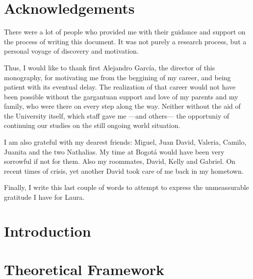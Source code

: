 \documentclass[12pt,letterpaper,oneside]{book}
\begin{document}
\vspace{2mm}

\chapter*{Acknowledgements}

There were a lot of people who provided me with their guidance and support on the process of writing this document. 
It was not purely a research process, but a personal voyage of discovery and motivation. 

Thus, I would like to thank first Alejandro García, the director of this monography, 
for motivating me from the beggining of my career, and being patient with its eventual delay. 
The realization of that career would not have been possible without the gargantuan support and love of my parents and my family, 
who were there on every step along the way.
Neither without the aid of the University itself, which staff gave me ---and others--- 
the opportuniy of continuing our studies on the still ongoing world situation.

I am also grateful with my dearest friends: Miguel, Juan David, Valeria, Camilo, Juanita and the two Nathalias. 
My time at Bogotá would have been very sorrowful if not for them. 
Also my roommates, David, Kelly and Gabriel. 
On recent times of crisis, yet another David took care of me back in my hometown.

Finally, I write this last couple of words to attempt to express the unmeassurable gratitude I have for Laura.

\mainmatter

\tableofcontents

\newpage

\visibleintenttrue

\chapter{Introduction}

	
\chapter{Theoretical Framework}




	
\end{document}
